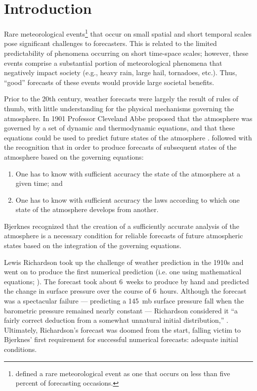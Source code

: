 

\chapter{Introduction}
\label{intro}

Rare meteorological events\footnote{\cite{Murphy1991} defined a rare meteorological event as one that occurs on less than five percent of forecasting occasions.} that occur on small spatial and short temporal scales pose significant challenges to forecasters.
This is related to the limited predictability of phenomena occurring on short time-space scales; however, these events comprise a substantial portion of meteorological phenomena that negatively impact society (e.g., heavy rain, large hail, tornadoes, etc.).
Thus, ``good'' forecasts of these events would provide large societal benefits.


Prior to the 20th century, weather forecasts were largely the result of rules of thumb, with little understanding for the physical mechanisms governing the atmosphere.
In 1901 Professor Cleveland Abbe proposed that the atmosphere was governed by a set of dynamic and thermodynamic equations, and that these equations could be used to predict future states of the atmosphere \citep{Abbe1901}.
\cite{Bjerknes1904} followed with the recognition that in order to produce forecasts of subsequent states of the atmosphere based on the governing equations:
\begin{enumerate}
    \item One has to know with sufficient accuracy the state of the atmosphere at a given time; and
    \item One has to know with sufficient accuracy the laws according to which one state of the atmosphere develops from another.
\end{enumerate}
Bjerknes recognized that the creation of a sufficiently accurate analysis of the atmosphere is a necessary condition for reliable forecasts of future atmospheric states based on the integration of the governing equations.


Lewis Richardson took up the challenge of weather prediction in the 1910s and went on to produce the first numerical prediction (i.e. one using mathematical equations; \citealp{Lynch2008}).
The forecast took about \mbox{6 weeks} to produce by hand and predicted the change in surface pressure over the course of \mbox{6 hours}.
Although the forecast was a spectacular failure --- predicting a \mbox{145 mb} surface pressure fall when the barometric pressure remained nearly constant --- Richardson considered it ``a fairly correct deduction from a somewhat unnatural initial distribution,'' \citep{Lynch2008}.
Ultimately, Richardson's forecast was doomed from the start, falling victim to Bjerknes' first requirement for successful numerical forecasts: adequate initial conditions.


